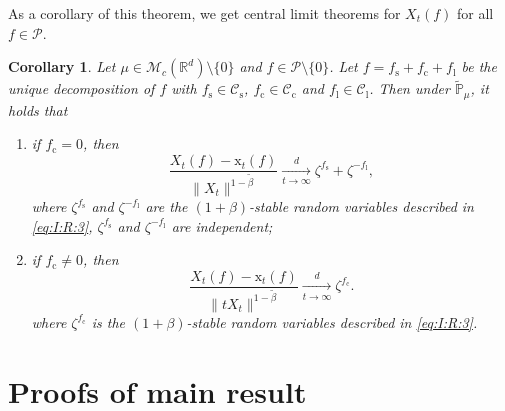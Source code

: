\documentclass[12pt,a4paper]{amsart}
\theoremstyle{plain}
\newtheorem{cor}[thm]{Corollary}
\theoremstyle{definition}
\numberwithin{equation}{section}
\begin{document}
As a corollary of this theorem, we get  central limit theorems for $X_t(f)$ for all $f\in \mathcal P$.

\begin{cor} Let $\mu\in \mathcal M_c(\mathbb R^d)\setminus \{0\}$ and $f\in \mathcal P\setminus\{0\}$. Let  $f=f_\mathrm s + f_\mathrm c + f_\mathrm l$ be the unique decomposition of $f$ with $f_\mathrm s \in \mathcal C_\mathrm s$, $f_\mathrm c \in \mathcal C_\mathrm c$ and $f_\mathrm l \in \mathcal C_\mathrm l$.
Then under $\widetilde {\mathbb{P}}_{\mu}$, it holds that
\begin{enumerate}
\item  if $f_\mathrm c=0$, then
\[
    \frac{ X_t(f) - \mathrm x_t(f)}{\|X_t\|^{1-\tilde \beta}}
    \xrightarrow[t\to \infty]{d}
     \zeta^{f_\mathrm s}+\zeta^{-f_\mathrm l},
\]
%
	where $\zeta^{f_\mathrm s}$ and $\zeta^{-f_\mathrm l}$  are the $(1+\beta)$-stable random variables described in \eqref{eq:I:R:3}, $\zeta^{f_\mathrm s}$ and $\zeta^{-f_\mathrm l}$ are independent;
\item if $f_\mathrm c\neq0$, then
\[
  \frac{ X_t(f) - \mathrm x_t(f)}{\|tX_t\|^{1-\tilde \beta}}
    \xrightarrow[t\to \infty]{d}\zeta^{f_\mathrm c}.
\]
%
	where $\zeta^{f_\mathrm c}$ is the $(1+\beta)$-stable random variables described in \eqref{eq:I:R:3}.
\end{enumerate}
\end{cor}


\section{Proofs of main result}
\label{proofs of main results}

\end{document}
